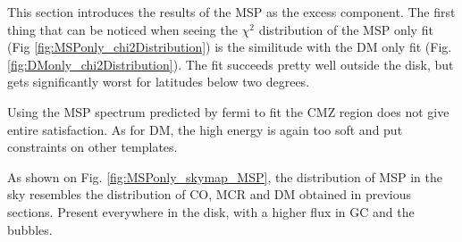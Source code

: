 This section introduces the results of the MSP as the excess component.
The first thing that can be noticed when seeing the $\chi^2$ distribution of the MSP only fit (Fig \ref{fig:MSPonly_chi2Distribution}) is the similitude with the DM only fit (Fig. \ref{fig:DMonly_chi2Distribution}). The fit succeeds pretty well outside the disk, but gets significantly worst for latitudes below two degrees.


Using the MSP spectrum predicted by fermi \cite{Fermi2017} to fit the CMZ region does not give entire satisfaction.
As for DM, the high energy is again too soft and put constraints on other templates.


As shown on Fig. \ref{fig:MSPonly_skymap_MSP}, the distribution of MSP in the sky resembles the distribution of CO, MCR and DM obtained in previous sections. Present everywhere in the disk, with a higher flux in GC and the bubbles.



